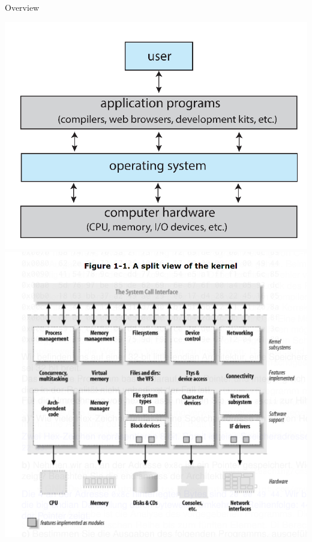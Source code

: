 \documentclass[10pt]{beamer}
\begin{document}
\begin{frame}[allowframebreaks]{Overview}
\begin{center}
 \includegraphics[keepaspectratio, width=\textwidth, height=\textheight-2\baselineskip-2\baselineskip]{img/000_software_layers.png} \\ \framebreak
  \includegraphics[keepaspectratio, width=\textwidth, height=\textheight-2\baselineskip-2\baselineskip]{img/000_kernel_split.png} \\ \framebreak

\end{center}
\end{frame}
\end{document}
